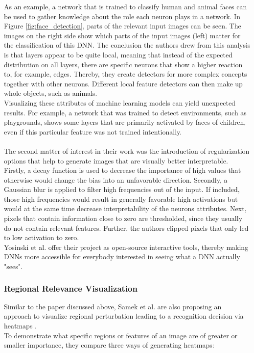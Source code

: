 \documentclass{acmsiggraph}               %
\begin{document}
As an example, a network that is trained to classify human and animal faces can be used to gather knowledge about the role each neuron plays in a network. In Figure \ref{fig:face_detection}, parts of the relevant input images can be seen. The images on the right side show which parts of the input images (left) matter for the classification of this DNN. The conclusion the authors drew from this analysis is that layers appear to be quite local, meaning that instead of the expected distribution on all layers, there are specific neurons that show a higher reaction to, for example, edges. Thereby, they create detectors for more complex concepts together with other neurons. Different local feature detectors can then make up whole objects, such as animals. \\
Visualizing these attributes of machine learning models can yield unexpected results. For example, a network that was trained to detect environments, such as playgrounds, shows some layers that are primarily activated by faces of children, even if this particular feature was not trained intentionally.\\\\
The second matter of interest in their work was the introduction of regularization options that help to generate images that are visually better interpretable.\\
Firstly, a decay function is used to decrease the importance of high values that otherwise would change the bias into an unfavorable direction. Secondly, a Gaussian blur is applied to filter high frequencies out of the input. If included, those high frequencies would result in generally favorable high activations but would at the same time decrease interpretability of the neurons attributes. Next, pixels that contain information close to zero are thresholded, since they usually do not contain relevant features. Further, the authors clipped pixels that only led to low activation to zero.\\
Yosinski et al. offer their project as open-source interactive tools, thereby making DNNs more accessible for everybody interested in seeing what a DNN actually "sees".

\subsubsection{Regional Relevance Visualization}
Similar to the paper discussed above, Samek et al. are also proposing an approach to visualize regional perturbation leading to a recognition decision via heatmaps \cite{Samek2017}. \\
To demonstrate what specific regions or features of an image are of greater or smaller importance, they compare three ways of generating heatmaps:
\end{document}
